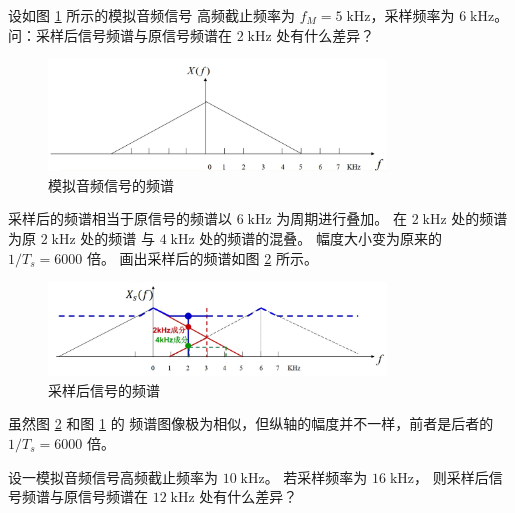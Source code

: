 \begin{example}
    设如图 \ref{fig:aliasing-example-3} 所示的模拟音频信号
    高频截止频率为 $f_M = 5\;\mathrm{kHz}$，采样频率为 $6\;\mathrm{kHz}$。
    问：采样后信号频谱与原信号频谱在 $2\;\mathrm{kHz}$ 处有什么差异？
    \begin{figure}[H]
        \centering
        \includegraphics[width=0.8\textwidth]{chap2/img/aliasing-example-3.png}
        \caption{模拟音频信号的频谱}
        \label{fig:aliasing-example-3}
    \end{figure}
\end{example}

\begin{solution}
    采样后的频谱相当于原信号的频谱以 $6\;\mathrm{kHz}$ 为周期进行叠加。
    在 $2\;\mathrm{kHz}$ 处的频谱为原 $2\;\mathrm{kHz}$ 处的频谱
    与 $4\;\mathrm{kHz}$ 处的频谱的混叠。
    幅度大小变为原来的 $1/T_s = 6000$ 倍。
    画出采样后的频谱如图 \ref{fig:aliasing-example-4} 所示。
    \begin{figure}[H]
        \centering
        \includegraphics[width=0.8\textwidth]{chap2/img/aliasing-example-4.png}
        \caption{采样后信号的频谱}
        \label{fig:aliasing-example-4}
    \end{figure}
\end{solution}

\begin{note}
    虽然图 \ref{fig:aliasing-example-4} 和图 \ref{fig:aliasing-example-3} 的
    频谱图像极为相似，但纵轴的幅度并不一样，前者是后者的 $1/T_s = 6000$ 倍。
\end{note}

\begin{example}
    设一模拟音频信号高频截止频率为 $10\;\mathrm{kHz}$。
    若采样频率为 $16\;\mathrm{kHz}$，
    则采样后信号频谱与原信号频谱在 $12\;\mathrm{kHz}$ 处有什么差异？
\end{example}

